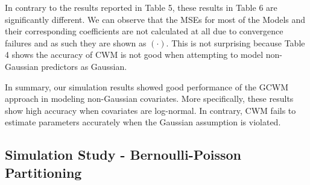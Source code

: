 \documentclass[11pt,letterpaper]{article}
\numberwithin{equation}{section}
\numberwithin{equation}{section}
\numberwithin{equation}{section}
\begin{document}
In contrary to the results reported in Table 5, these results in Table 6 are significantly different. We can observe that the MSEs for most of the Models and their corresponding coefficients are not calculated at all due to convergence failures and as such they are shown as $(\cdot)$. This is not surprising because Table 4 shows the accuracy of CWM is not good when attempting to model non-Gaussian predictors as Gaussian.

In summary, our simulation results showed good performance of the GCWM approach in modeling non-Gaussian covariates. More specifically, these results show high accuracy when covariates are log-normal. In contrary, CWM fails to estimate parameters accurately when the Gaussian assumption is violated.

\subsection{Simulation Study - Bernoulli-Poisson Partitioning}
\end{document}
